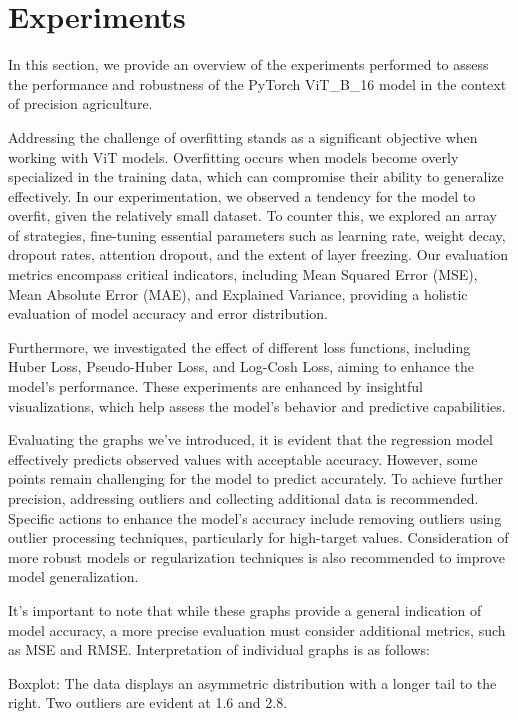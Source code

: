 \section{Experiments}
\label{sec:experiments}

In this section, we provide an overview of the experiments performed to assess the performance and robustness of the PyTorch ViT\_B\_16 model in the context of precision agriculture.

Addressing the challenge of overfitting stands as a significant objective when working with ViT models. Overfitting occurs when models become overly specialized in the training data, which can compromise their ability to generalize effectively. In our experimentation, we observed a tendency for the model to overfit, given the relatively small dataset. To counter this, we explored an array of strategies, fine-tuning essential parameters such as learning rate, weight decay, dropout rates, attention dropout, and the extent of layer freezing. Our evaluation metrics encompass critical indicators, including Mean Squared Error (MSE), Mean Absolute Error (MAE), and Explained Variance, providing a holistic evaluation of model accuracy and error distribution.

Furthermore, we investigated the effect of different loss functions, including Huber Loss, Pseudo-Huber Loss, and Log-Cosh Loss, aiming to enhance the model's performance. These experiments are enhanced by insightful visualizations, which help assess the model's behavior and predictive capabilities.

Evaluating the graphs we've introduced, it is evident that the regression model effectively predicts observed values with acceptable accuracy. However, some points remain challenging for the model to predict accurately. To achieve further precision, addressing outliers and collecting additional data is recommended. Specific actions to enhance the model's accuracy include removing outliers using outlier processing techniques, particularly for high-target values. Consideration of more robust models or regularization techniques is also recommended to improve model generalization.

It's important to note that while these graphs provide a general indication of model accuracy, a more precise evaluation must consider additional metrics, such as MSE and RMSE. Interpretation of individual graphs is as follows:

Boxplot: The data displays an asymmetric distribution with a longer tail to the right. Two outliers are evident at 1.6 and 2.8.

